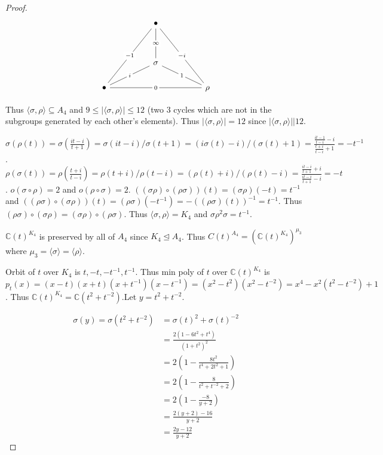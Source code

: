 \documentclass{article}
\newcommand{\C}{\mathbb{C}}
\newcommand{\abs}[1]{\left\lvert #1\right\rvert}
\newcommand{\angles}[1]{\langle #1 \rangle}
\begin{document}
\begin{proof}
    \[\begin{tikzcd}
        && \bullet \\
        \\
        && \sigma \\
        \bullet &&&& \rho
        \arrow["{-1}"{description}, no head, from=4-1, to=1-3]
        \arrow["\infty"{description}, no head, from=1-3, to=3-3]
        \arrow["{-i}"{description}, no head, from=1-3, to=4-5]
        \arrow["1"{description}, no head, from=3-3, to=4-5]
        \arrow["i"{description}, no head, from=4-1, to=3-3]
        \arrow["0"{description}, no head, from=4-1, to=4-5]
    \end{tikzcd}\]

    Thus $\angles{\sigma, \rho} \subseteq A_4$ and $9 \leq \abs{\angles{\sigma, \rho}} \leq 12$ (two 3 cycles which are not in the subgroups generated by each other's elements). Thus $\abs{\angles{\sigma, \rho}} = 12$ since $\abs{\angles{\sigma, \rho}} | 12$.
    
    
    $\sigma(\rho(t)) = \sigma(\frac{it - i}{t + 1}) = \sigma(it - i) / \sigma(t + 1) = (i\sigma(t) - i) / (\sigma(t) + 1) = \frac{\frac{it - 1}{t - i} - i}{\frac{t + i}{t - i} + 1} = -t^{-1}$. $\rho(\sigma(t)) = \rho(\frac{t + i}{t - i}) = \rho(t + i) / \rho(t - i) = (\rho(t) +i)/(\rho(t) - i) = \frac{\frac{it - i}{t + 1} + i}{\frac{it - i}{t  + 1} - i} = -t$. $o(\sigma \circ \rho) = 2$ and $o(\rho \circ \sigma) = 2$. $((\sigma \rho)\circ (\rho \sigma))(t) = (\sigma \rho)(-t) = t^{-1}$ and $((\rho \sigma) \circ (\sigma \rho))(t) = (\rho \sigma)(-t^{-1}) = -((\rho \sigma)(t))^{-1} = t^{-1}$. Thus $(\rho \sigma) \circ (\sigma \rho) = (\sigma \rho)\circ (\rho \sigma)$. Thus $\angles{\sigma, \rho} = K_4$ and $\sigma \rho^2 \sigma = t^{-1}$. 
    
    $\C(t)^{K_4}$ is preserved by all of $A_4$ since $K_4 \trianglelefteq A_4$. Thus $C(t)^{A_4} = (\C(t)^{K_4})^{\mu_3}$ where $\mu_3 = \angles{\sigma} = \angles{\rho}$. 
    
    
    Orbit of $t$ over $K_4$ is $t, -t, -t^{-1}, t^{-1}$. Thus min poly of $t$ over $\C(t)^{K_4}$ is $p_t(x) = (x - t)(x + t)(x + t^{-1})(x - t^{-1}) = (x^2 - t^2)(x^2 - t^{-2}) = x^4 - x^2(t^2 - t^{-2}) + 1$. Thus $\C(t)^{K_4} = \C(t^2 + t^{-2})$.Let $y = t^2 + t^{-2}$.  
    
    \begin{align*}
        \sigma(y) = \sigma(t^2 + t^{-2}) &= \sigma(t)^2 + \sigma(t)^{-2} \\
        &= \frac{2 (1 - 6 t^2 + t^4)}{(1 + t^2)^2} \\
        &= 2(1 - \frac{8t^2}{t^4 + 2t^2 + 1}) \\
        &= 2(1 - \frac{8}{t^2 + t^{-2} + 2}) \\
        &= 2(1 - \frac{-8}{y + 2}) \\
        &= \frac{2(y + 2) - 16}{y + 2} \\
        &= \frac{2y - 12}{y + 2}
    \end{align*} 


\end{proof}
\end{document}
